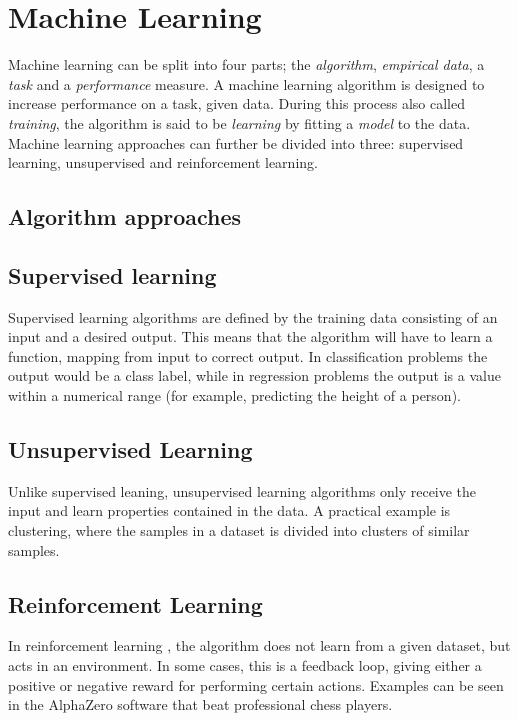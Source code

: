 \section{Machine Learning} \label{Machine Learning}
    Machine learning can be split into four parts; the \textit{algorithm}, \textit{empirical data}, a \textit{task} and a \textit{performance} measure\cite{Goodfellow-et-al-2016_ML}. A machine learning algorithm is designed to increase performance on a task, given data. During this process also called \textit{training}, the algorithm is said to be \textit{learning} by fitting a \textit{model} to the data. Machine learning approaches can further be divided into three\cite{Goodfellow-et-al-2016_E}: supervised learning, unsupervised and reinforcement learning. 
    
    \subsection{Algorithm approaches} \label{Algorithm types}
        \subsection{Supervised learning}
            Supervised learning \cite{Goodfellow-et-al-2016_E} algorithms are defined by the training data consisting of an input and a desired output. This means that the algorithm will have to learn a function, mapping from input to correct output. In classification problems the output would be a class label, while in regression problems the output is a value within a numerical range (for example, predicting the height of a person).
            
        \subsection{Unsupervised Learning}
            Unlike supervised leaning, unsupervised learning algorithms only receive the input and learn properties contained in the data\cite{Goodfellow-et-al-2016_E}. A practical example is clustering, where the samples in a dataset is divided into clusters of similar samples. 
                
        \subsection{Reinforcement Learning}
            In reinforcement learning \cite{Goodfellow-et-al-2016_E}, the algorithm does not learn from a given dataset, but acts in an environment. In some cases, this is a feedback loop, giving either a positive or negative reward for performing certain actions. Examples can be seen in the AlphaZero software that beat professional chess players\cite{silver2017mastering}.
    
